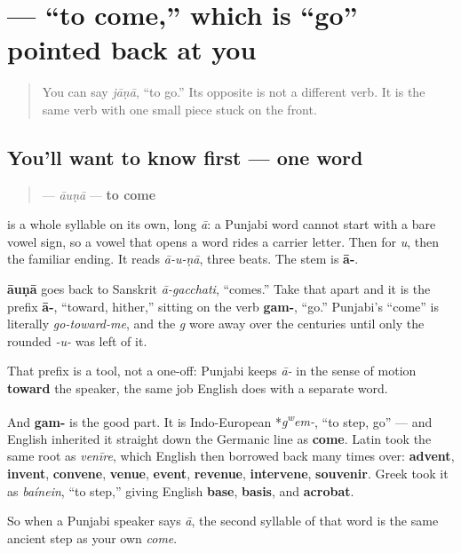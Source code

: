 \section[\texorpdfstring{\pa{ਆਉਣਾ} (āuṇā)}{ਆਉਣਾ (āuṇā)}]{ — “to come,” which is “go” pointed back at you}

\label{lesson:PA-C07-auna}



\begin{quote}
You can say \emph{jāṇā}, “to go.” Its opposite is not a different verb. It is the same verb with one small piece stuck on the front.
\end{quote}

\subsection*{You'll want to know first — one word}
\begin{quote}
\textbf{} — \emph{āuṇā} — \textbf{to come}
\end{quote}

\textbf{} is a whole syllable on its own, long \emph{ā}: a Punjabi word cannot start with a bare vowel sign, so a vowel that opens a word rides a carrier letter. Then \textbf{} for \emph{u}, then the familiar \textbf{} ending. It reads \emph{ā-u-ṇā}, three beats. The stem is \textbf{ā-}.

\begin{cousinweb}
\textbf{āuṇā} goes back to Sanskrit \emph{ā-gacchati}, “comes.” Take that apart and it is the prefix \textbf{ā-}, “toward, hither,” sitting on the verb \textbf{gam-}, “go.” Punjabi's “come” is literally \emph{go-toward-me}, and the \emph{g} wore away over the centuries until only the rounded \emph{-u-} was left of it.

That prefix is a tool, not a one-off: Punjabi keeps \emph{ā-} in the sense of motion \textbf{toward} the speaker, the same job English does with a separate word.

And \textbf{gam-} is the good part. It is Indo-European *\emph{g\textsuperscript{w}em-}, “to step, go” — and English inherited it straight down the Germanic line as \textbf{come}. Latin took the same root as \emph{venīre}, which English then borrowed back many times over: \textbf{advent}, \textbf{invent}, \textbf{convene}, \textbf{venue}, \textbf{event}, \textbf{revenue}, \textbf{intervene}, \textbf{souvenir}. Greek took it as \emph{baínein}, “to step,” giving English \textbf{base}, \textbf{basis}, and \textbf{acrobat}.

So when a Punjabi speaker says \emph{ā}, the second syllable of that word is the same ancient step as your own \emph{come}.
\end{cousinweb}


